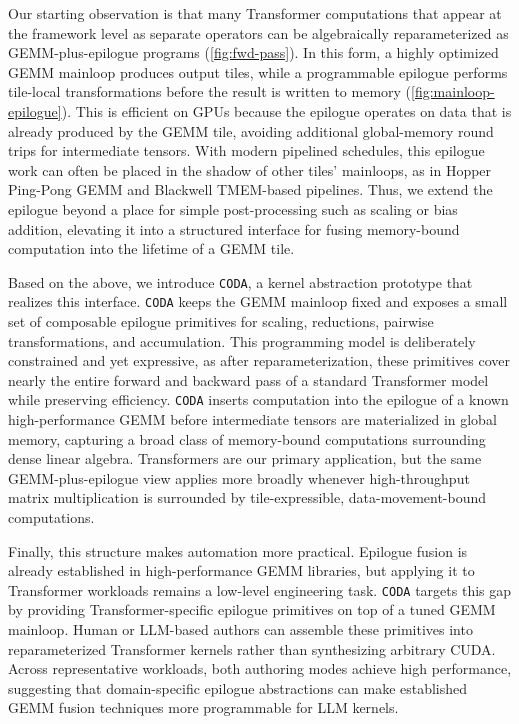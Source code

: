 Our starting observation is that many Transformer computations that appear at the framework level as separate operators can be algebraically reparameterized as GEMM-plus-epilogue programs (\cref{fig:fwd-pass}). In this form, a highly optimized GEMM mainloop produces output tiles, while a programmable epilogue performs tile-local transformations before the result is written to memory (\cref{fig:mainloop-epilogue}). This is efficient on GPUs because the epilogue operates on data that is already produced by the GEMM tile, avoiding additional global-memory round trips for intermediate tensors. With modern pipelined schedules, this epilogue work can often be placed in the shadow of other tiles' mainloops, as in Hopper Ping-Pong GEMM and Blackwell TMEM-based pipelines.
Thus, we extend the epilogue beyond a place for simple post-processing such as scaling or bias addition, elevating it into a structured interface for fusing memory-bound computation into the lifetime of a GEMM tile.

Based on the above, we introduce \texttt{CODA}, a kernel abstraction prototype that realizes this interface. \texttt{CODA} keeps the GEMM mainloop fixed and exposes a small set of composable epilogue primitives for scaling, reductions, pairwise transformations, and accumulation. This programming model is deliberately constrained and yet expressive, as after reparameterization, these primitives cover nearly the entire forward and backward pass of a standard Transformer model while preserving efficiency. \texttt{CODA} inserts computation into the epilogue of a known high-performance GEMM before intermediate tensors are materialized in global memory, capturing a broad class of memory-bound computations surrounding dense linear algebra. Transformers are our primary application, but the same GEMM-plus-epilogue view applies more broadly whenever high-throughput matrix multiplication is surrounded by tile-expressible, data-movement-bound computations.

Finally, this structure makes automation more practical. Epilogue fusion is already established in high-performance GEMM libraries, but applying it to Transformer workloads remains a low-level engineering task. \texttt{CODA} targets this gap by providing Transformer-specific epilogue primitives on top of a tuned GEMM mainloop. Human or LLM-based authors can assemble these primitives into reparameterized Transformer kernels rather than synthesizing arbitrary CUDA. Across representative workloads, both authoring modes achieve high performance, suggesting that domain-specific epilogue abstractions can make established GEMM fusion techniques more programmable for LLM kernels.



